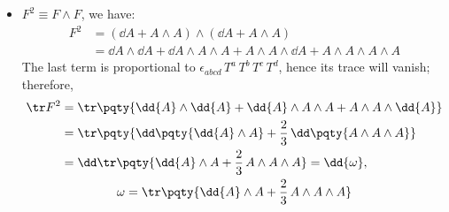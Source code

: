 \documentclass[a4paper,10pt]{article}
\begin{document}
\begin{itemize}
	\item $F^2\equiv F\wedge F$, we have:
	\begin{equation}
	\begin{aligned}
		F^2
		&= (\dd{A} + A\wedge A)
			\wedge (\dd{A} + A\wedge A) \\
		&= \dd{A} \wedge \dd{A}
			+ \dd{A} \wedge A \wedge A
			+ A \wedge A \wedge \dd{A}
			+ A \wedge A \wedge A \wedge A
	\end{aligned}
	\end{equation}
	The last term is proportional to $
		\epsilon_{abcd}\,T^a\,T^b\,T^c\,T^d
	$, hence its trace will vanish; therefore,
	\begin{gather}
	\begin{aligned}
		\tr F^2
		&= \tr \pqty{
			\dd{A} \wedge \dd{A}
			+ \dd{A} \wedge A \wedge A
			+ A \wedge A \wedge \dd{A}
		} \\
		&= \tr \pqty{
			\dd\pqty{\dd{A} \wedge A}
			+ \frac{2}{3}\,\dd\pqty{
				A \wedge A \wedge A
			}
		} \\
		&= \dd \tr \pqty{
			\dd{A} \wedge A
			+ \frac{2}{3}\,A \wedge A \wedge A
		} = \dd{\omega},
	\end{aligned}\\
		\omega = \tr \pqty{
			\dd{A} \wedge A
			+ \frac{2}{3}\,A \wedge A \wedge A
		}
	\end{gather}
	\vspace{-1.8\baselineskip}
	\end{itemize}
	\qedfull
	\vspace{-1\baselineskip}
\end{document}
